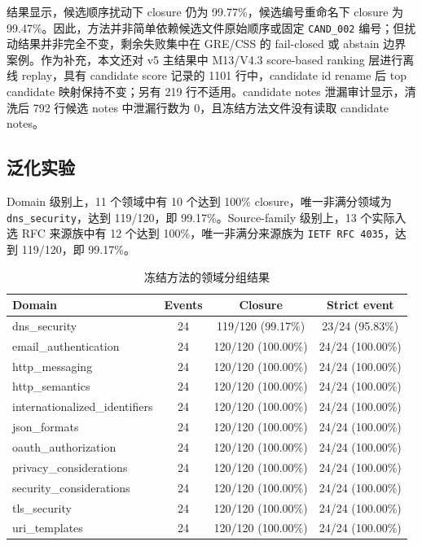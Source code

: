 \documentclass[11pt]{article}
\begin{document}
结果显示，候选顺序扰动下 closure 仍为 99.77\%，候选编号重命名下 closure 为 99.47\%。因此，方法并非简单依赖候选文件原始顺序或固定 \texttt{CAND\_002} 编号；但扰动结果并非完全不变，剩余失败集中在 GRE/CSS 的 fail-closed 或 abstain 边界案例。作为补充，本文还对 v5 主结果中 M13/V4.3 score-based ranking 层进行离线 replay，具有 candidate score 记录的 1101 行中，candidate id rename 后 top candidate 映射保持不变；另有 219 行不适用。candidate notes 泄漏审计显示，清洗后 792 行候选 notes 中泄漏行数为 0，且冻结方法文件没有读取 candidate notes。

\subsection{泛化实验}

Domain 级别上，11 个领域中有 10 个达到 100\% closure，唯一非满分领域为 \texttt{dns\_security}，达到 119/120，即 99.17\%。Source-family 级别上，13 个实际入选 RFC 来源族中有 12 个达到 100\%，唯一非满分来源族为 \texttt{IETF RFC 4035}，达到 119/120，即 99.17\%。

\begin{table}[t]
\centering
\caption{冻结方法的领域分组结果}
\label{tab:domain}
\begin{tabular}{lccc}
\toprule
Domain & Events & Closure & Strict event \\
\midrule
dns\_security & 24 & 119/120 (99.17\%) & 23/24 (95.83\%) \\
email\_authentication & 24 & 120/120 (100.00\%) & 24/24 (100.00\%) \\
http\_messaging & 24 & 120/120 (100.00\%) & 24/24 (100.00\%) \\
http\_semantics & 24 & 120/120 (100.00\%) & 24/24 (100.00\%) \\
internationalized\_identifiers & 24 & 120/120 (100.00\%) & 24/24 (100.00\%) \\
json\_formats & 24 & 120/120 (100.00\%) & 24/24 (100.00\%) \\
oauth\_authorization & 24 & 120/120 (100.00\%) & 24/24 (100.00\%) \\
privacy\_considerations & 24 & 120/120 (100.00\%) & 24/24 (100.00\%) \\
security\_considerations & 24 & 120/120 (100.00\%) & 24/24 (100.00\%) \\
tls\_security & 24 & 120/120 (100.00\%) & 24/24 (100.00\%) \\
uri\_templates & 24 & 120/120 (100.00\%) & 24/24 (100.00\%) \\
\bottomrule
\end{tabular}
\end{table}
\end{document}
